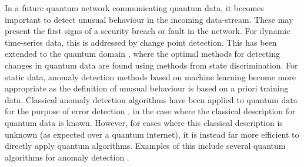 \documentclass[twocolumn, aps, rmp, amsmath, amssymb, nofootinbib, superscriptaddress, longbibliography, floatfix, table-of-contents, eqsecnum]{revtex4}
\begin{document}
In a future quantum network communicating quantum data, it becomes important to detect unusual behaviour in the incoming data-stream. These may present the first signs of a security breach or fault in the network. For dynamic time-series data, this is addressed by change point detection. This has been extended to the quantum domain \cite{bib:gael1, bib:gael2}, where the optimal methods for detecting changes in quantum data are found using methods from state discrimination. For static data, anomaly detection methods based on machine learning become more appropriate as the definition of unusual behaviour is based on a priori training data. Classical anomaly detection algorithms have been applied to quantum data for the purpose of error detection \cite{bib:sara}, in the case where the classical description for quantum data is known. However, for cases where this classical description is unknown (as expected over a quantum internet), it is instead far more efficient to directly apply quantum algorithms. Examples of this include several quantum algorithms for anomaly detection \cite{bib:liu2018quantum}.



\printindex
\end{document}
